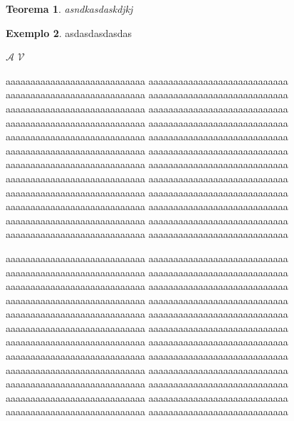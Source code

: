 \documentclass{article}
\newtheorem{teo}{Teorema}
\theoremstyle{definition}%
\newtheorem{ex}[teo]{Exemplo}
\begin{document}
\begin{teo}
    asndkasdaskdjkj
\end{teo}

\begin{ex}
    asdasdasdasdas
\end{ex}


$\mathcal{A}$
$\mathcal{V}$

\vspace{.5cm}

\begin{minipage}{.5\textwidth}
    aaaaaaaaaaaaaaaaaaaaaaaaaaaa aaaaaaaaaaaaaaaaaaaaaaaaaaaa aaaaaaaaaaaaaaaaaaaaaaaaaaaa aaaaaaaaaaaaaaaaaaaaaaaaaaaa aaaaaaaaaaaaaaaaaaaaaaaaaaaa aaaaaaaaaaaaaaaaaaaaaaaaaaaa aaaaaaaaaaaaaaaaaaaaaaaaaaaa aaaaaaaaaaaaaaaaaaaaaaaaaaaa aaaaaaaaaaaaaaaaaaaaaaaaaaaa aaaaaaaaaaaaaaaaaaaaaaaaaaaa aaaaaaaaaaaaaaaaaaaaaaaaaaaa aaaaaaaaaaaaaaaaaaaaaaaaaaaa aaaaaaaaaaaaaaaaaaaaaaaaaaaa aaaaaaaaaaaaaaaaaaaaaaaaaaaa aaaaaaaaaaaaaaaaaaaaaaaaaaaa aaaaaaaaaaaaaaaaaaaaaaaaaaaa aaaaaaaaaaaaaaaaaaaaaaaaaaaa aaaaaaaaaaaaaaaaaaaaaaaaaaaa aaaaaaaaaaaaaaaaaaaaaaaaaaaa aaaaaaaaaaaaaaaaaaaaaaaaaaaa aaaaaaaaaaaaaaaaaaaaaaaaaaaa aaaaaaaaaaaaaaaaaaaaaaaaaaaa aaaaaaaaaaaaaaaaaaaaaaaaaaaa aaaaaaaaaaaaaaaaaaaaaaaaaaaa
\end{minipage}
\begin{minipage}{.5\textwidth}
    aaaaaaaaaaaaaaaaaaaaaaaaaaaa aaaaaaaaaaaaaaaaaaaaaaaaaaaa aaaaaaaaaaaaaaaaaaaaaaaaaaaa aaaaaaaaaaaaaaaaaaaaaaaaaaaa aaaaaaaaaaaaaaaaaaaaaaaaaaaa aaaaaaaaaaaaaaaaaaaaaaaaaaaa aaaaaaaaaaaaaaaaaaaaaaaaaaaa aaaaaaaaaaaaaaaaaaaaaaaaaaaa aaaaaaaaaaaaaaaaaaaaaaaaaaaa aaaaaaaaaaaaaaaaaaaaaaaaaaaa aaaaaaaaaaaaaaaaaaaaaaaaaaaa aaaaaaaaaaaaaaaaaaaaaaaaaaaa aaaaaaaaaaaaaaaaaaaaaaaaaaaa aaaaaaaaaaaaaaaaaaaaaaaaaaaa aaaaaaaaaaaaaaaaaaaaaaaaaaaa aaaaaaaaaaaaaaaaaaaaaaaaaaaa aaaaaaaaaaaaaaaaaaaaaaaaaaaa aaaaaaaaaaaaaaaaaaaaaaaaaaaa aaaaaaaaaaaaaaaaaaaaaaaaaaaa aaaaaaaaaaaaaaaaaaaaaaaaaaaa aaaaaaaaaaaaaaaaaaaaaaaaaaaa aaaaaaaaaaaaaaaaaaaaaaaaaaaa aaaaaaaaaaaaaaaaaaaaaaaaaaaa aaaaaaaaaaaaaaaaaaaaaaaaaaaa
\end{minipage}
\end{document}

